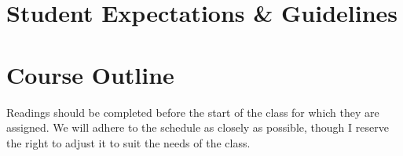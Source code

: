\documentclass[titlepage]{article}
\newcommand\policy{../policy}
\begin{document}




\section{Student Expectations \& Guidelines}
\label{expectations}







\section{Course Outline}
\label{outline}

Readings should be completed before the start of the class for which
they are assigned. We will adhere to the schedule as closely as
possible, though I reserve the right to adjust it to suit the needs of
the class.
\end{document}
